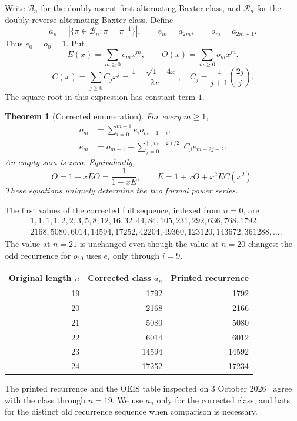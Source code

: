\documentclass[11pt,letterpaper]{article}
\numberwithin{equation}{section}
\newtheorem{theorem}{Theorem}[section]
\theoremstyle{remark}\newtheorem{remark}[theorem]{Remark}
\newcommand{\BB}{\mathcal B}
\newcommand{\RR}{\mathcal R}
\begin{document}
Write $\BB_n$ for the doubly ascent-first alternating Baxter class,
and $\RR_n$ for the doubly reverse-alternating Baxter class. Define
\[
 a_n=|\{\pi\in\BB_n:\pi=\pi^{-1}\}|,
 \qquad e_m=a_{2m},\qquad o_m=a_{2m+1}.
\]
Thus $e_0=o_0=1$. Put
\[
 E(x)=\sum_{m\ge0}e_mx^m,\qquad
 O(x)=\sum_{m\ge0}o_mx^m.
\]
\[
 C(x)=\sum_{j\ge0}C_jx^j=\frac{1-\sqrt{1-4x}}{2x},
 \quad C_j=\frac1{j+1}\binom{2j}{j}.
\]
The square root in this expression has constant term $1$.

\begin{theorem}[Corrected enumeration]\label{abx:en:thm:enumeration}
For every $m\ge1$,
\begin{align}
 o_m&=\sum_{i=0}^{m-1}e_i o_{m-1-i},\label{abx:en:eq:orec}\\
 e_m&=o_{m-1}+
 \sum_{j=0}^{\lfloor(m-2)/2\rfloor}C_j e_{m-2j-2}.\label{abx:en:eq:erec}
\end{align}
An empty sum is zero. Equivalently,
\begin{equation}\label{abx:en:eq:system}
 O=1+xEO=\frac1{1-xE},\qquad
 E=1+xO+x^2E C(x^2).
\end{equation}
These equations uniquely determine the two formal power series.
\end{theorem}

The first values of the corrected full sequence, indexed from $n=0$,
are
\begin{align*}
&1,1,1,1,2,2,3,5,8,12,16,32,44,84,105,231,292,636,768,1792,\\
&2168,5080,6014,14594,17252,42204,49360,123120,143672,361288,\ldots.
\end{align*}
The value at $n=21$ is unchanged even though the value at $n=20$
changes: the odd recurrence for $o_{10}$ uses $e_i$ only through $i=9$.

\begin{center}
\begin{tabular}{rrr}
\toprule
Original length $n$ & Corrected class $a_n$ & Printed recurrence\\
\midrule
19&1792&1792\\
20&2168&2166\\
21&5080&5080\\
22&6014&6012\\
23&14594&14592\\
24&17252&17234\\
\bottomrule
\end{tabular}
\end{center}
The printed recurrence and the OEIS table inspected on 3 October
2026~\cite{min2021,oeis} agree with the class through $n=19$.
We use $a_n$ only for the corrected class, and hats for the distinct
old recurrence sequence when comparison is necessary.
\end{document}
